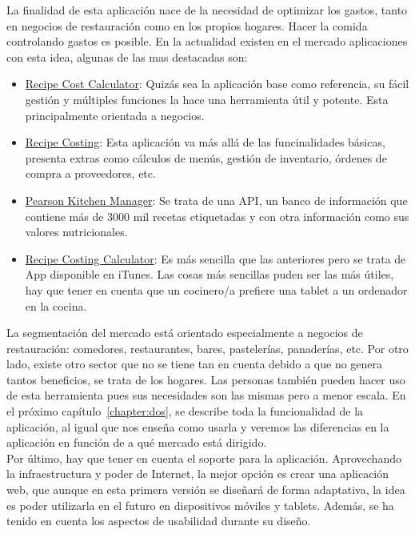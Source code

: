 \vspace*{0.1in}
La finalidad de esta aplicación nace de la necesidad de optimizar los gastos, tanto en negocios de restauración como en los propios hogares. Hacer la comida controlando gastos es posible. En la actualidad existen en el mercado aplicaciones con esta idea, algunas de las mas destacadas son:
\begin{itemize}
	\item \href{https://recipecostcalculator.net/}{Recipe Cost Calculator}: Quizás sea la aplicación base como referencia, su fácil gestión y múltiples funciones la hace una herramienta útil y potente. Esta principalmente orientada a negocios.
	\item \href{http://www.recipe-costing.com/}{Recipe Costing}: Esta aplicación va más allá de las funcinalidades básicas, presenta extras como cálculos de menús, gestión de inventario, órdenes de compra a proveedores, etc.
	\item \href{http://developer.pearson.com/apis/pearson-kitchen-manager}{Pearson Kitchen Manager}: Se trata de una API, un banco de información que contiene más de 3000 mil recetas etiquetadas y con otra información como sus valores nutricionales.
	\item \href{https://itunes.apple.com/es/app/recipe-costing-calculator/id646877156?mt=8}{Recipe Costing Calculator}: Es más sencilla que las anteriores pero se trata de App disponible en iTunes. Las cosas más sencillas puden ser las más útiles, hay que tener en cuenta que un cocinero/a prefiere una tablet a un ordenador en la cocina.
\end{itemize}
La segmentación del mercado está orientado especialmente a negocios de restauración: comedores, restaurantes, bares, pastelerías, panaderías, etc. Por otro lado, existe otro sector que no se tiene tan en cuenta debido a que no genera tantos beneficios, se trata de los hogares. Las personas también pueden hacer uso de esta herramienta pues sus necesidades son las mismas pero a menor escala. En el próximo capítulo~\ref{chapter:dos}, se describe toda la funcionalidad de la aplicación, al igual que nos enseña como usarla y veremos las diferencias en la aplicación en función de a qué mercado está dirigido.\\

Por último, hay que tener en cuenta el soporte para la aplicación. Aprovechando la infraestructura y poder de Internet, la mejor opción es crear una aplicación web, que aunque en esta primera versión se diseñará de forma adaptativa, la idea es poder utilizarla en el futuro en dispositivos móviles y tablets. Además, se ha tenido en cuenta los aspectos de usabilidad durante su diseño.

